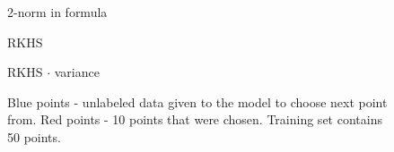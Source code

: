 \documentclass[a4paper]{article}
\begin{document}
\begin{figure}[h]
\begin{minipage}[h]{0.49\linewidth}
\end{minipage}
\vfill
\begin{minipage}[h]{0.49\linewidth}
 2-norm in formula
\end{minipage}
\hfill
\begin{minipage}[h]{0.49\linewidth}
 RKHS
\end{minipage}
\vfill
\begin{minipage}[h]{0.49\linewidth}
 RKHS $\cdot$ variance
\end{minipage}
\caption{Blue points - unlabeled data given to the model to choose next point from. Red points - 10 points that were chosen. Training set contains 50 points.}
\label{recent1}
\end{figure}
\end{document}
